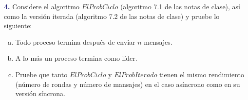 \newpage\textbf{\textcolor{MidnightBlue}{4.}}
Considere el algoritmo $ElProbCiclo$ (algoritmo 7.1 de las notas de clase), así como
la versión iterada (algoritmo 7.2 de las notas de clase) y pruebe lo siguiente:
\begin{enumerate}[a)]
\item Todo proceso termina después de enviar $n$ mensajes.
\item A lo más un proceso termina como líder.

\item Pruebe que tanto $ElProbCiclo$ y $ElProbIterado$ tienen el mismo rendimiento
(número de rondas y número de mansajes) en el caso asíncrono como en su versión
síncrona.
\end{enumerate}
